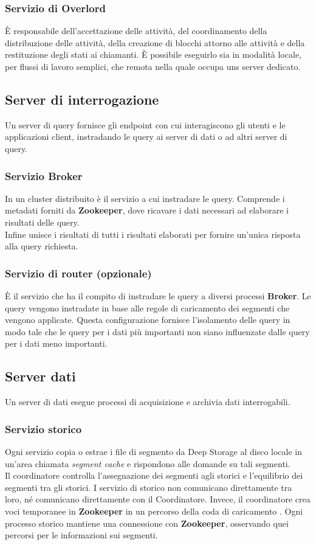 \documentclass{article}
\begin{document}
\subsubsection{Servizio di Overlord}
 È responsabile dell'accettazione delle attività, del coordinamento della distribuzione delle attività, della creazione di blocchi attorno alle attività e della restituzione degli stati ai chiamanti. È possibile eseguirlo sia in modalità locale, per flussi di lavoro semplici, che remota nella quale occupa uns server dedicato.
 \subsection{Server di interrogazione}
 Un server di query fornisce gli endpoint con cui interagiscono gli utenti e le applicazioni client, instradando le query ai server di dati o ad altri server di query.
 \subsubsection{Servizio Broker}
In un cluster distribuito è il servizio a cui instradare le query. Comprende i metadati forniti da \textbf{Zookeeper}, dove ricavare i dati necessari ad elaborare i risultati delle query.\\
Infine unisce i risultati di tutti i risultati elaborati per fornire un'unica risposta alla query richiesta.
\subsubsection{Servizio di router (opzionale)}
 È il servizio che ha il compito di instradare le query a diversi processi \textbf{Broker}. Le query vengono instradate in base alle regole di caricamento dei segmenti che vengono applicate. Questa configurazione fornisce l'isolamento delle query in modo tale che le query per i dati più importanti non siano influenzate dalle query per i dati meno importanti.
 \subsection{Server dati}
 Un server di dati esegue processi di acquisizione e archivia dati interrogabili.
 \subsubsection{Servizio storico}
 Ogni servizio  copia o estrae i file di segmento da Deep Storage al disco locale in un'area chiamata \textit{segment cache} e rispondono alle domande su tali segmenti.\\Il coordinatore controlla l'assegnazione dei segmenti agli storici e l'equilibrio dei segmenti tra gli storici.  I servizio di storico non comunicano direttamente tra loro, né comunicano direttamente con il Coordinatore. Invece, il coordinatore crea voci temporanee in \textbf{Zookeeper} in un percorso della coda di caricamento . Ogni processo storico mantiene una connessione con \textbf{Zookeeper}, osservando quei percorsi per le informazioni sui segmenti.
\end{document}
